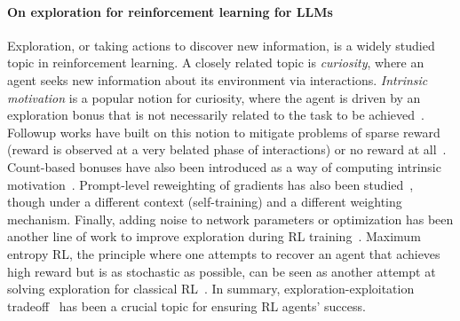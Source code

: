 \documentclass[10pt]{article} %
\begin{document}
\paragraph{On exploration for reinforcement learning for LLMs} Exploration, or taking actions to discover new information, is a widely studied topic in reinforcement learning. A closely related topic is \textit{curiosity}, where an agent seeks new information about its environment via interactions. \textit{Intrinsic motivation} is a popular notion for curiosity, where the agent is driven by an exploration bonus that is not necessarily related to the task to be achieved~\citep{schmidhuber1991curious,schmidhuber2007godel}. Followup works have built on this notion to mitigate problems of sparse reward (reward is observed at a very belated phase of interactions) or no reward at all~\citep{pathak2017curiosity,pathak2019self,eysenbach2018diversity,burda2018exploration,sharma2019dynamics,yang2024explorationantiexplorationdistributionalrandom,vime}. Count-based bonuses have also been introduced as a way of computing intrinsic motivation~\citep{bellemare2016unifyingcountbasedexplorationintrinsic}. Prompt-level reweighting of gradients has also been studied~\citep{yu2025restrainspuriousvotessignals}, though under a different context (self-training) and a different weighting mechanism. Finally, adding noise to network parameters or optimization has been another line of work to improve exploration during RL training~\citep{fortunato2019noisynetworksexploration,ishfaq2024efficientrandomizedexplorationreinforcement,ishfaq2024provablepracticalefficientexploration,ishfaq2025langevinsoftactorcriticefficient}. Maximum entropy RL, the principle where one attempts to recover an agent that achieves high reward but is as stochastic as possible, can be seen as another attempt at solving exploration for classical RL~\citep{haarnoja2018softactorcriticoffpolicymaximum,boucher2025evidenceregularisationpropertiesmaximumentropy,eysenbach2022maximumentropyrlprovably,dong2025maximumentropyreinforcementlearning}. In summary, exploration-exploitation tradeoff~\citep{sutton1988learning,auer2002finite,thompson1933likelihood} has been a crucial topic for ensuring RL agents' success.
\end{document}
